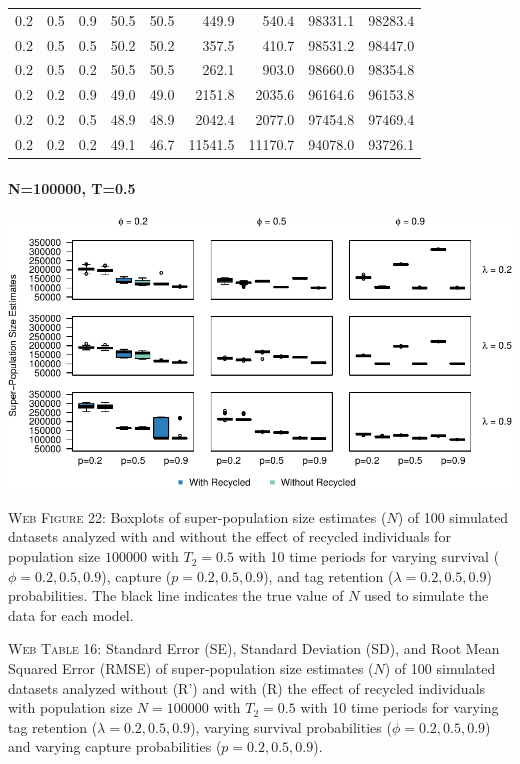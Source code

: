 \documentclass[]{article}
\let\oldparagraph\paragraph
\renewcommand{\paragraph}[1]{\oldparagraph{#1}\mbox{}}
\begin{document}
\begin{table}[ht]
{\begin{tabular}{rrrrrrrrr}
  0.2 & 0.5 & 0.9 & 50.5 & 50.5 & 449.9 & 540.4 & 98331.1 & 98283.4 \\ 
  0.2 & 0.5 & 0.5 & 50.2 & 50.2 & 357.5 & 410.7 & 98531.2 & 98447.0 \\ 
  0.2 & 0.5 & 0.2 & 50.5 & 50.5 & 262.1 & 903.0 & 98660.0 & 98354.8 \\ 
  0.2 & 0.2 & 0.9 & 49.0 & 49.0 & 2151.8 & 2035.6 & 96164.6 & 96153.8 \\ 
  0.2 & 0.2 & 0.5 & 48.9 & 48.9 & 2042.4 & 2077.0 & 97454.8 & 97469.4 \\ 
  0.2 & 0.2 & 0.2 & 49.1 & 46.7 & 11541.5 & 11170.7 & 94078.0 & 93726.1 \\ 
   \hline
\end{tabular}
}
\endgroup
\end{table}

\newpage

\paragraph{N=100000, T=0.5}\label{n100000-t0.5-4}

\includegraphics{Appendix_files/figure-latex/figure22_superN_GJSTL3-1.pdf}

\textsc{Web Figure 22:} Boxplots of super-population size estimates
(\(N\)) of 100 simulated datasets analyzed with and without the effect
of recycled individuals for population size \(100000\) with \(T_2=0.5\)
with 10 time periods for varying survival (\(\phi=0.2,0.5,0.9\)),
capture (\(p=0.2,0.5,0.9\)), and tag retention (\(\lambda=0.2,0.5,0.9\))
probabilities. The black line indicates the true value of \(N\) used to
simulate the data for each model.

\textsc{Web Table 16:} Standard Error (SE), Standard Deviation (SD), and
Root Mean Squared Error (RMSE) of super-population size estimates
(\(N\)) of 100 simulated datasets analyzed without (R') and with (R) the
effect of recycled individuals with population size \(N=100000\) with
\(T_2=0.5\) with 10 time periods for varying tag retention
(\(\lambda=0.2,0.5,0.9\)), varying survival probabilities
(\(\phi=0.2,0.5,0.9\)) and varying capture probabilities
(\(p=0.2,0.5,0.9\)).
\end{document}
